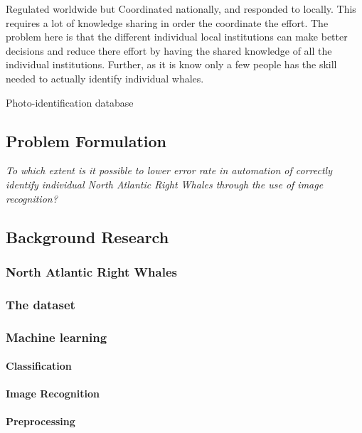 Regulated worldwide but Coordinated nationally, and responded to locally. This requires a lot of knowledge sharing in order the coordinate the effort. The problem here is that the different individual local institutions can make better decisions and reduce there effort by having the shared knowledge of all the individual institutions.
Further, as it is know only a few people has the skill needed to actually identify individual whales.

Photo-identification database


\subsection{Problem Formulation}

\begin{center}
\textit{To which extent is it possible to lower error rate in automation of correctly identify individual North Atlantic Right Whales through the use of image recognition?}
\end{center}

\subsection{Background Research}

\subsubsection{North Atlantic Right Whales}

\subsubsection{The dataset}


\subsubsection{Machine learning}
\paragraph{Classification}
\paragraph{Image Recognition}
\paragraph{Preprocessing}